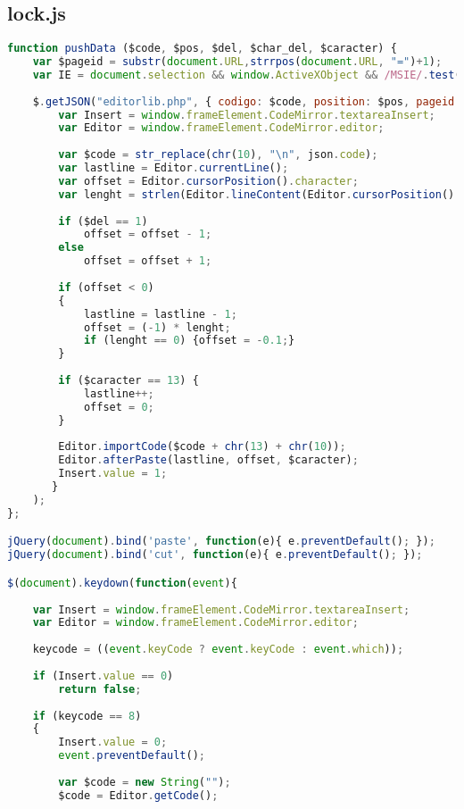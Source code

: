 \subsection{lock.js}
\begin{lstlisting}[language=Javascript]
function pushData ($code, $pos, $del, $char_del, $caracter) {
	var $pageid = substr(document.URL,strrpos(document.URL, "=")+1); 
	var IE = document.selection && window.ActiveXObject && /MSIE/.test(navigator.userAgent);
		
    $.getJSON("editorlib.php", { codigo: $code, position: $pos, pageid: $pageid, mode: "1", del: $del, char_del: $char_del }, function(json) {
    	var Insert = window.frameElement.CodeMirror.textareaInsert;
    	var Editor = window.frameElement.CodeMirror.editor;
    	
        var $code = str_replace(chr(10), "\n", json.code);
        var lastline = Editor.currentLine();
        var offset = Editor.cursorPosition().character;
        var lenght = strlen(Editor.lineContent(Editor.cursorPosition().line));
        
        if ($del == 1)
        	offset = offset - 1;
        else
            offset = offset + 1;
        
        if (offset < 0)
        {
        	lastline = lastline - 1;
        	offset = (-1) * lenght;
        	if (lenght == 0) {offset = -0.1;}
        }
        
        if ($caracter == 13) {
        	lastline++;
        	offset = 0;
        }
        
        Editor.importCode($code + chr(13) + chr(10));
        Editor.afterPaste(lastline, offset, $caracter);
        Insert.value = 1;
       }
    );
};

jQuery(document).bind('paste', function(e){ e.preventDefault(); });
jQuery(document).bind('cut', function(e){ e.preventDefault(); });

$(document).keydown(function(event){
	
	var Insert = window.frameElement.CodeMirror.textareaInsert;
	var Editor = window.frameElement.CodeMirror.editor;
	
	keycode = ((event.keyCode ? event.keyCode : event.which));
	
	if (Insert.value == 0)
		return false;
	
	if (keycode == 8)
	{
		Insert.value = 0;
		event.preventDefault();
		
		var $code = new String("");
		$code = Editor.getCode();
  

\end{lstlisting}
